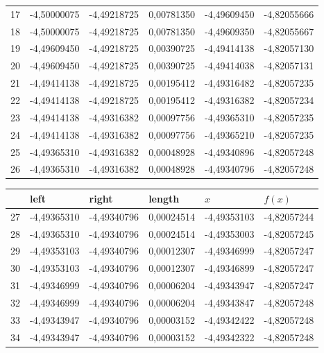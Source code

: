 \begin{center}
\begin{tabular}{ | l | l | l | l | l | l |}
        17            & -4,50000075 & -4,49218725 & 0,00781350 & -4,49609450 & -4,82055666 \\
        18            & -4,50000075 & -4,49218725 & 0,00781350 & -4,49609350 & -4,82055667 \\
        19            & -4,49609450 & -4,49218725 & 0,00390725 & -4,49414138 & -4,82057130 \\
        20            & -4,49609450 & -4,49218725 & 0,00390725 & -4,49414038 & -4,82057131 \\
        21            & -4,49414138 & -4,49218725 & 0,00195412 & -4,49316482 & -4,82057235 \\
        22            & -4,49414138 & -4,49218725 & 0,00195412 & -4,49316382 & -4,82057234 \\
        23            & -4,49414138 & -4,49316382 & 0,00097756 & -4,49365310 & -4,82057235 \\
        24            & -4,49414138 & -4,49316382 & 0,00097756 & -4,49365210 & -4,82057235 \\
        25            & -4,49365310 & -4,49316382 & 0,00048928 & -4,49340896 & -4,82057248 \\
        26            & -4,49365310 & -4,49316382 & 0,00048928 & -4,49340796 & -4,82057248 \\ \hline
    \end{tabular}
    \begin{tabular}{ | l | l | l | l | l | l |}
        \hline
        \textnumero{} & left        & right       & length     & $x$         & $f(x)$      \\ \hline
        27            & -4,49365310 & -4,49340796 & 0,00024514 & -4,49353103 & -4,82057244 \\
        28            & -4,49365310 & -4,49340796 & 0,00024514 & -4,49353003 & -4,82057245 \\
        29            & -4,49353103 & -4,49340796 & 0,00012307 & -4,49346999 & -4,82057247 \\
        30            & -4,49353103 & -4,49340796 & 0,00012307 & -4,49346899 & -4,82057247 \\
        31            & -4,49346999 & -4,49340796 & 0,00006204 & -4,49343947 & -4,82057247 \\
        32            & -4,49346999 & -4,49340796 & 0,00006204 & -4,49343847 & -4,82057248 \\
        33            & -4,49343947 & -4,49340796 & 0,00003152 & -4,49342422 & -4,82057248 \\
        34            & -4,49343947 & -4,49340796 & 0,00003152 & -4,49342322 & -4,82057248 \\ \hline
    \end{tabular}
\end{center}

